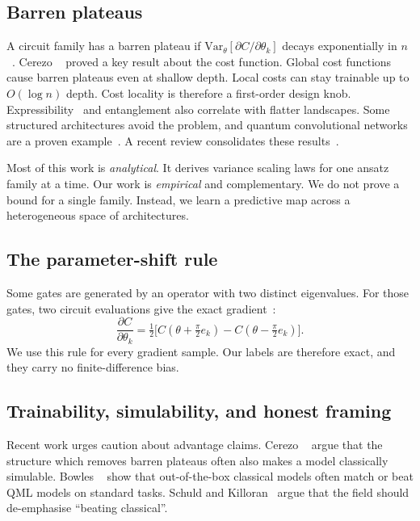 \documentclass[12pt]{iopart}
\begin{document}
\subsection{Barren plateaus}
A circuit family has a barren plateau if
$\mathrm{Var}_\theta[\partial C/\partial\theta_k]$ decays exponentially in
$n$~\cite{mcclean2018barren}. Cerezo \etal~\cite{cerezo2021cost} proved a key
result about the cost function. Global cost functions cause barren plateaus even
at shallow depth. Local costs can stay trainable up to $O(\log n)$ depth. Cost
locality is therefore a first-order design knob.
Expressibility~\cite{holmes2022expressibility} and entanglement also correlate
with flatter landscapes. Some structured architectures avoid the problem, and
quantum convolutional networks are a proven example~\cite{pesah2021absence}. A
recent review consolidates these results~\cite{larocca2025barren}.

Most of this work is \emph{analytical}. It derives variance scaling laws for one
ansatz family at a time. Our work is \emph{empirical} and complementary. We do
not prove a bound for a single family. Instead, we learn a predictive map across
a heterogeneous space of architectures.

\subsection{The parameter-shift rule}
Some gates are generated by an operator with two distinct eigenvalues. For those
gates, two circuit evaluations give the exact
gradient~\cite{mitarai2018circuit,schuld2019param}:
\begin{equation}
\frac{\partial C}{\partial\theta_k}
  = \tfrac{1}{2}\big[C(\theta + \tfrac{\pi}{2}e_k)
  - C(\theta - \tfrac{\pi}{2}e_k)\big].
\end{equation}
We use this rule for every gradient sample. Our labels are therefore exact, and
they carry no finite-difference bias.

\subsection{Trainability, simulability, and honest framing}
Recent work urges caution about advantage claims. Cerezo
\etal~\cite{cerezo2025simulability} argue that the structure which removes barren
plateaus often also makes a model classically simulable. Bowles
\etal~\cite{bowles2024benchmarking} show that out-of-the-box classical models
often match or beat QML models on standard tasks. Schuld and
Killoran~\cite{schuld2022killoran} argue that the field should de-emphasise
``beating classical''.
\end{document}
